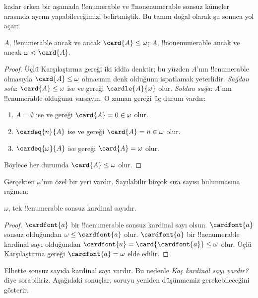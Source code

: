 kadar erken bir aşamada
!!{enumerable} ve !!{nonenumerable} sonsuz kümeler arasında ayrım
yapabileceğimizi belirtmiştik. Bu tanım doğal olarak şu sonuca yol açar:

\begin{prop}
$A$, !!{enumerable} ancak ve ancak $\card{A}\leq\omega$; $A$,
!!{nonenumerable} ancak ve ancak $\omega<\card{A}$.
\end{prop}

\begin{proof}
Üçlü Karşılaştırma gereği iki iddia denktir; bu yüzden $A$'nın
!!{enumerable} olmasıyla $\card{A}\leq\omega$ olmasının denk olduğunu
ispatlamak yeterlidir. \emph{Sağdan sola}: $\card{A}\leq\omega$ ise
 ve
 gereği $\cardle{A}{\omega}$ olur.
\emph{Soldan sağa}: $A$'nın !!{enumerable} olduğunu varsayın. O zaman
 gereği üç durum vardır:
\begin{enumerate}
	\item $A=\emptyset$ ise  ve
	 gereği
	$\card{A}=0\in\omega$ olur.
	\item $\cardeq{n}{A}$ ise  ve
	 gereği
	$\card{A}=n\in\omega$ olur.
	\item $\cardeq{\omega}{A}$ ise  gereği
	$\card{A}=\omega$ olur.
\end{enumerate}
Böylece her durumda $\card{A}\leq\omega$ olur.
\end{proof}
\noindent
Gerçekten $\omega$'nın özel bir yeri vardır. Sayılabilir birçok sıra sayısı
bulunmasına rağmen:

\begin{cor}
$\omega$, tek !!{enumerable} sonsuz kardinal sayıdır.
\end{cor}

\begin{proof}
$\cardfont{a}$ bir !!a{enumerable} sonsuz kardinal sayı olsun.
$\cardfont{a}$ sonsuz olduğundan $\omega\leq\cardfont{a}$ olur.
$\cardfont{a}$ bir !!a{enumerable} kardinal sayı olduğundan
$\cardfont{a}=\card{\cardfont{a}}\leq\omega$ olur. Üçlü Karşılaştırma
gereği $\cardfont{a}=\omega$ elde edilir.
\end{proof}

Elbette sonsuz sayıda kardinal sayı vardır. Bu nedenle \emph{Kaç kardinal
sayı vardır?} diye sorabiliriz. Aşağıdaki sonuçlar, soruyu yeniden
düşünmemiz gerekebileceğini gösterir.

